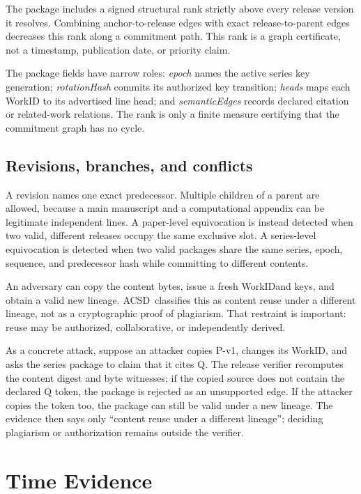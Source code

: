 \documentclass[11pt]{article}
\newcommand{\workid}{\textsf{WorkID}}
\newcommand{\acsd}{\textsc{ACSD}}
\begin{document}
The package includes a signed structural rank strictly above every release version it resolves. Combining anchor-to-release edges with exact release-to-parent edges decreases this rank along a commitment path. This rank is a graph certificate, not a timestamp, publication date, or priority claim.

The package fields have narrow roles: \textit{epoch} names the active series
key generation; \textit{rotationHash} commits its authorized key transition;
\textit{heads} maps each WorkID to its advertised line head; and
\textit{semanticEdges} records declared citation or related-work relations.
The rank is only a finite measure certifying that the commitment graph has no
cycle.

\subsection{Revisions, branches, and conflicts}

A revision names one exact predecessor. Multiple children of a parent are allowed, because a main manuscript and a computational appendix can be legitimate independent lines. A paper-level equivocation is instead detected when two valid, different releases occupy the same exclusive slot. A series-level equivocation is detected when two valid packages share the same series, epoch, sequence, and predecessor hash while committing to different contents.

An adversary can copy the content bytes, issue a fresh \workid and keys, and obtain a valid new lineage. \acsd\ classifies this as content reuse under a different lineage, not as a cryptographic proof of plagiarism. That restraint is important: reuse may be authorized, collaborative, or independently derived.

As a concrete attack, suppose an attacker copies P-v1, changes its WorkID,
and asks the series package to claim that it cites Q. The release verifier
recomputes the content digest and byte witnesses; if the copied source does not
contain the declared Q token, the package is rejected as an unsupported edge.
If the attacker copies the token too, the package can still be valid under a
new lineage. The evidence then says only “content reuse under a different
lineage”; deciding plagiarism or authorization remains outside the verifier.

\section{Time Evidence}
\end{document}
